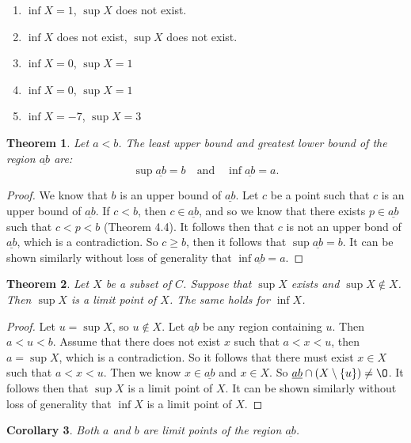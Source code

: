 \documentclass[12pt]{article}
\renewcommand{\emptyset}{\O}
\renewcommand{\_}[1]{\underline{ #1 }}
\newtheorem{theorem}{Theorem}[section]
\newtheorem{corollary}[theorem]{Corollary}
\theoremstyle{definition}
\numberwithin{equation}{subsection}
\begin{document}
\begin{enumerate}
\item $\inf X = 1$, $\sup X$ does not exist.
\item $\inf X$ does not exist, $\sup X$ does not exist.
\item $\inf X = 0$, $\sup X = 1$
\item $\inf X = $0, $\sup X = 1$
\item $\inf X = -7$, $\sup X = 3$
\end{enumerate}


\begin{theorem}  Let $a < b$.  The least upper bound and greatest lower bound of the region $\_{ab}$ are:
\[
\sup \_{ab} = b \quad \text{and} \quad \inf \_{ab} = a.
\]
\end{theorem}

\begin{proof}
We know that $b$ is an upper bound of $\_{ab}$. Let $c$ be a point such that $c$ is an upper bound of $\_{ab}$. If $c < b$, then $c \in \_{ab}$, and so we know that there exists $p \in \_{ab}$ such that $c < p < b$ (Theorem 4.4). It follows then that $c$ is not an upper bond of $\_{ab}$, which is a contradiction. So $c \geq b$, then it follows that $\sup \_{ab} = b$. It can be shown similarly without loss of generality that $\inf \_{ab} = a$.
\end{proof}

\begin{theorem}  
Let $X$ be a subset of $C$.
Suppose that $\sup X$ exists and $\sup X \notin X$.  Then $\sup X$ is a limit point of $X$.  The same holds for $\inf X$.
\end{theorem}

\begin{proof}
Let $u = \sup X$, so $u \not \in X$. Let $\_{ab}$ be any region containing $u$. Then $a < u < b$. Assume that there does not exist $x$ such that $a < x < u$, then $a = \sup X$, which is a contradiction. So it follows that there must exist $x \in X$ such that $a < x < u$. Then we know $x \in \_{ab}$ and $x \in X$. So $\_{ab} \cap (X \setminus \{u\}) \not = \emptyset$. It follows then that $\sup X$ is a limit point of $X$. It can be shown similarly without loss of generality that $\inf X$ is a limit point of $X$.
\end{proof}

\begin{corollary}  Both $a$ and $b$ are limit points of the region $\underline{ab}$.
\end{corollary}
\end{document}
